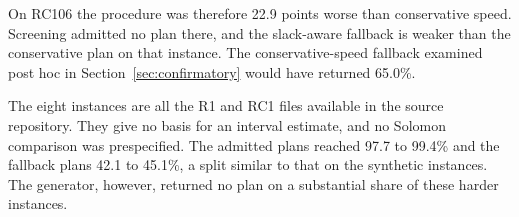On RC106 the procedure was therefore 22.9 points worse than conservative speed. Screening admitted no plan there, and the slack-aware fallback is weaker than the conservative plan on that instance. The conservative-speed fallback examined post hoc in Section~\ref{sec:confirmatory} would have returned 65.0\%.

The eight instances are all the R1 and RC1 files available in the source repository. They give no basis for an interval estimate, and no Solomon comparison was prespecified. The admitted plans reached 97.7 to 99.4\% and the fallback plans 42.1 to 45.1\%, a split similar to that on the synthetic instances. The generator, however, returned no plan on a substantial share of these harder instances.
